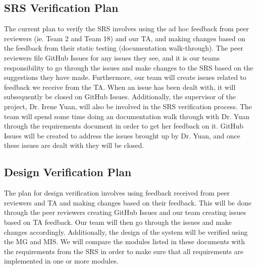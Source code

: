 \documentclass[12pt, titlepage]{article}
\begin{document}
\subsection{SRS Verification Plan} \label{SRSVerification}


The current plan to verify the SRS involves using the ad hoc feedback from peer reviewers (ie. Team 2 and Team 18) and our TA, and making changes based on
the feedback from their static testing (documentation walk-through). The peer reviewers file GitHub Issues for any issues they see, and it is our teams responsibility to go through the issues and make changes to the SRS based on the suggestions they have made. Furthermore, our team will create issues related to feedback we receive from the TA. When an issue has been dealt with, it will subsequently be closed on GitHub Issues. Additionally, the supervisor of the project, Dr. Irene Yuan, will also be involved in the SRS verification process. The team will spend some time doing an documentation walk through with Dr. Yuan through the requirements document in order to get her feedback on it. GitHub Issues will be created to address the issues brought up by Dr. Yuan, and once these issues are dealt with they will be closed.

\subsection{Design Verification Plan}



The plan for design verification involves using feedback received from peer reviewers and TA and making changes based on their feedback. This will be done through the peer reviewers creating GitHub Issues and our team creating issues based on TA feedback. Our team will then go through the issues and make changes accordingly. Additionally, the design of the system will be verified using the MG and MIS. We will compare the modules listed in these documents with the requirements from the SRS in order to make sure that all requirements are implemented in one or more modules. 
\end{document}
